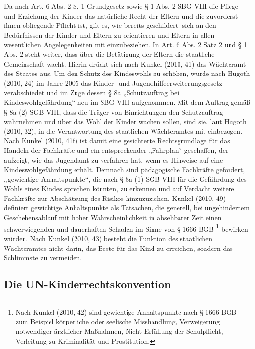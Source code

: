 Da nach Art. 6 Abs. 2 S. 1 Grundgesetz sowie § 1 Abs. 2 SBG VIII die Pflege und Erziehung der Kinder das natürliche Recht der Eltern und die zuvorderst ihnen obliegende Pflicht ist, gilt es, wie bereits geschildert, sich an den Bedürfnissen der Kinder und Eltern zu orientieren und Eltern in allen wesentlichen Angelegenheiten mit einzubeziehen. In Art. 6 Abs. 2 Satz 2 und § 1 Abs. 2 steht weiter, dass über die Betätigung der Eltern die staatliche Gemeinschaft wacht. Hierin drückt sich nach Kunkel (2010, 41) das Wächteramt des Staates aus. Um den Schutz des Kindeswohls zu erhöhen, wurde nach Hugoth (2010, 24) im Jahre 2005 das Kinder- und Jugendhilfeerweiterungsgesetz   verabschiedet und im Zuge dessen § 8a „Schutzauftrag bei Kindeswohlgefährdung“ neu im SBG VIII aufgenommen. Mit dem Auftrag gemäß § 8a (2) SGB VIII, dass die Träger von Einrichtungen den Schutzauftrag wahrnehmen und über das Wohl der Kinder wachen sollen, sind sie, laut Hugoth (2010, 32), in die Verantwortung des staatlichen Wächteramtes mit einbezogen. Nach Kunkel (2010, 41f) ist damit eine gesichterte Rechtsgrundlage für das Handeln der Fachkräfte und ein entsprechender „Fahrplan“ geschaffen, der aufzeigt, wie das Jugendamt zu verfahren hat, wenn es Hinweise auf eine Kindeswohlgefährdung erhält. Demnach sind pädagogische Fachkräfte gefordert, „gewichtige Anhaltspunkte“, die nach § 8a (1) SGB VIII für die Gefährdung des Wohls eines Kindes sprechen könnten, zu erkennen und auf Verdacht weitere Fachkräfte zur Abschätzung des Risikos hinzuzuziehen. Kunkel (2010, 49) definiert gewichtige Anhaltspunkte als Tatsachen, die generell, bei ungehindertem Geschehensablauf mit hoher Wahrscheinlichkeit in absehbarer Zeit einen schwerwiegenden und dauerhaften Schaden im Sinne von § 1666 BGB \footnote{Nach Kunkel (2010, 42) sind gewichtige Anhaltspunkte nach § 1666 BGB zum Beispiel körperliche oder seelische Misshandlung, Verweigerung notwendiger ärztlicher Maßnahmen, Nicht-Erfüllung der Schulpflicht, Verleitung zu Kriminalität und Prostitution.} bewirken würden. Nach Kunkel (2010, 43) besteht die Funktion des staatlichen Wächteramtes nicht darin, das Beste für das Kind zu erreichen, sondern das Schlimmste zu vermeiden.

\subsection{Die UN-Kinderrechtskonvention}

